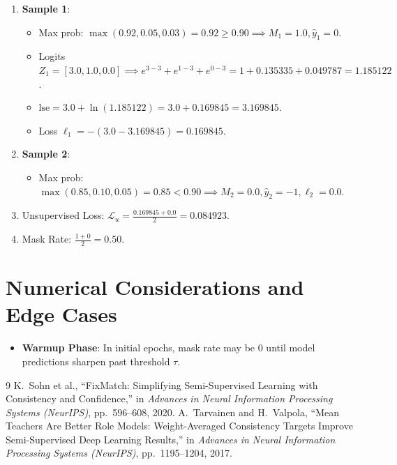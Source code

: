 \documentclass[11pt,a4paper]{article}
\theoremstyle{definition}
\begin{document}
\begin{enumerate}
    \item \textbf{Sample 1}:
    \begin{itemize}
        \item Max prob: $\max(0.92, 0.05, 0.03) = 0.92 \ge 0.90 \implies M_1 = 1.0, \hat{y}_1 = 0$.
        \item Logits $Z_1 = [3.0, 1.0, 0.0] \implies e^{3-3} + e^{1-3} + e^{0-3} = 1 + 0.135335 + 0.049787 = 1.185122$.
        \item $\text{lse} = 3.0 + \ln(1.185122) = 3.0 + 0.169845 = 3.169845$.
        \item Loss $\ell_1 = -(3.0 - 3.169845) = 0.169845$.
    \end{itemize}
    \item \textbf{Sample 2}:
    \begin{itemize}
        \item Max prob: $\max(0.85, 0.10, 0.05) = 0.85 < 0.90 \implies M_2 = 0.0, \hat{y}_2 = -1, \ell_2 = 0.0$.
    \end{itemize}
    \item Unsupervised Loss: $\mathcal{L}_u = \frac{0.169845 + 0.0}{2} = 0.084923$.
    \item Mask Rate: $\frac{1 + 0}{2} = 0.50$.
\end{enumerate}

\section{Numerical Considerations and Edge Cases}

\begin{itemize}
    \item \textbf{Warmup Phase}: In initial epochs, mask rate may be $0$ until model predictions sharpen past threshold $\tau$.
\end{itemize}

\begin{thebibliography}{9}
 K.~Sohn et al., ``FixMatch: Simplifying Semi-Supervised Learning with Consistency and Confidence,'' in \emph{Advances in Neural Information Processing Systems (NeurIPS)}, pp.~596--608, 2020.
 A.~Tarvainen and H.~Valpola, ``Mean Teachers Are Better Role Models: Weight-Averaged Consistency Targets Improve Semi-Supervised Deep Learning Results,'' in \emph{Advances in Neural Information Processing Systems (NeurIPS)}, pp.~1195--1204, 2017.
\end{thebibliography}
\end{document}
